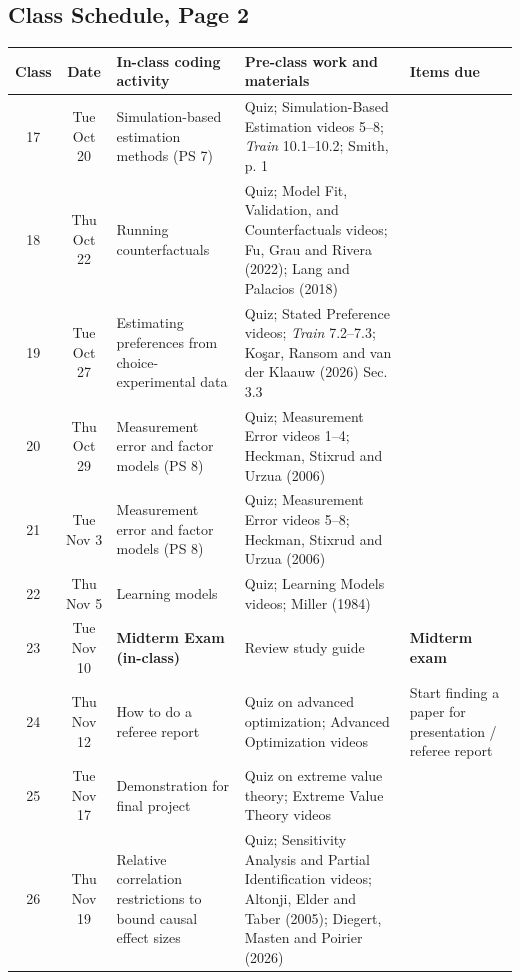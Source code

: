 \documentclass[11pt,english]{article}
\begin{document}
\begin{landscape}
\section*{Class Schedule, Page 2}
\begin{center}
\begin{tabular}{cc>{\raggedright}m{5.5cm}>{\raggedright}m{7.5cm}>{\raggedright}m{3.5cm}}
\toprule
\textbf{Class} & \textbf{Date} & \textbf{In-class coding activity} & \textbf{Pre-class work and materials} & \textbf{Items due} \tabularnewline \midrule
17  & Tue Oct 20 & Simulation-based estimation methods (PS 7)          & Quiz; Simulation-Based Estimation videos 5--8; \emph{Train} 10.1--10.2; Smith, p. 1 &  \tabularnewline
18  & Thu Oct 22 & Running counterfactuals                                        & Quiz; Model Fit, Validation, and Counterfactuals videos; Fu, Grau and Rivera (2022); Lang and Palacios (2018) &  \tabularnewline
19  & Tue Oct 27 & Estimating preferences from choice-experimental data           & Quiz; Stated Preference videos; \emph{Train} 7.2--7.3; Ko\c{s}ar, Ransom and van der Klaauw (2026) Sec. 3.3   &  \tabularnewline
20  & Thu Oct 29 & Measurement error and factor models (PS 8)                     & Quiz; Measurement Error videos 1--4; Heckman, Stixrud and Urzua (2006)                                        &  \tabularnewline
21  & Tue Nov 3  & Measurement error and factor models (PS 8)                     & Quiz; Measurement Error videos 5--8; Heckman, Stixrud and Urzua (2006)                                        &  \tabularnewline
22  & Thu Nov 5  & Learning models                                                & Quiz; Learning Models videos; Miller (1984)                                                                   &  \tabularnewline
23  & Tue Nov 10 & \textbf{Midterm Exam (in-class)}                               & Review study guide                                                                                           & \textbf{Midterm exam} \tabularnewline
24  & Thu Nov 12 & How to do a referee report                                     & Quiz on advanced optimization; Advanced Optimization videos                                                   & Start finding a paper for presentation / referee report \tabularnewline
25  & Tue Nov 17 & Demonstration for final project                                & Quiz on extreme value theory; Extreme Value Theory videos                                                     &  \tabularnewline
26  & Thu Nov 19 & Relative correlation restrictions to bound causal effect sizes & Quiz; Sensitivity Analysis and Partial Identification videos; Altonji, Elder and Taber (2005); Diegert, Masten and Poirier (2026) &  \tabularnewline

\end{tabular}
\end{center}
\end{landscape}
\end{document}
